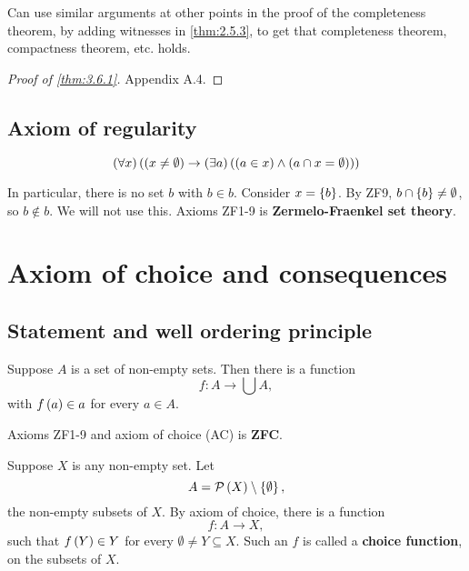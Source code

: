 
\begin{remark}
Can use similar arguments at other points in the proof of the completeness theorem, by adding witnesses in \ref{thm:2.5.3}, to get that completeness theorem, compactness theorem, etc. holds.
\end{remark}

\begin{proof}[Proof of \ref{thm:3.6.1}]
Appendix A.4.
\end{proof}

\subsection{Axiom of regularity}

\begin{axiom}
$$ \left( \forall x \right)\left( \left( x \ne \emptyset \right) \rightarrow \left( \exists a \right)\left( \left( a \in x \right) \land \left( a \cap x = \emptyset \right) \right) \right) $$
\end{axiom}

In particular, there is no set $ b $ with $ b \in b $. Consider $ x = \left\{ b \right\} $. By ZF9, $ b \cap \left\{ b \right\} \ne \emptyset $, so $ b \notin b $. We will not use this. Axioms ZF1-9 is \textbf{Zermelo-Fraenkel set theory}.

\pagebreak

\section{Axiom of choice and consequences}

\subsection{Statement and well ordering principle}

\begin{definition}
Suppose $ A $ is a set of non-empty sets. Then there is a function
$$ f : A \to \bigcup A, $$
with $ f\left( a \right) \in a $ for every $ a \in A $.
\end{definition}

Axioms ZF1-9 and axiom of choice (AC) is \textbf{ZFC}.

\begin{example}
Suppose $ X $ is any non-empty set. Let
$$ A = \mathcal{P}\left( X \right) \setminus \left\{ \emptyset \right\}, $$
the non-empty subsets of $ X $. By axiom of choice, there is a function
$$ f : A \to X, $$
such that $ f\left( Y \right) \in Y $ for every $ \emptyset \ne Y \subseteq X $. Such an $ f $ is called a \textbf{choice function}, on the subsets of $ X $.
\end{example}

